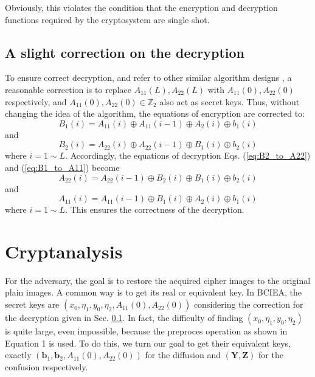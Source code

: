 \documentclass[final,3p,times,twocolumn]{elsarticle}
\begin{document}
Obviously, this violates the condition that the encryption and decryption functions required by the cryptosystem are single shot.

\subsection{A slight correction on the decryption}
\label{ssec:correction}

To ensure correct decryption, and refer to other similar algorithm designs \cite{ozkaynak:review:ND18}, a reasonable correction is to replace $A_{11}(L),A_{22}(L)$ with $A_{11}(0),A_{22}(0)$ respectively, and $A_{11}(0),A_{22}(0) \in \mathbb{Z}_{2}$ also act as secret keys.
Thus, without changing the idea of the algorithm, the equations of encryption are corrected to:
\begin{equation}
B_1(i) = A_{11}(i) \oplus A_{11}(i-1) \oplus A_{2}(i) \oplus b_{1}(i)
\label{eq:corr_B1_diffusion}
\end{equation}
and 
\begin{equation}
B_2(i) = A_{22}(i) \oplus A_{22}(i-1) \oplus B_{1}(i) \oplus b_{2}(i)
\label{eq:corr_B2_diffusion}
\end{equation}
where $i=1 \sim L$. Accordingly, the equations of decryption Eqs. (\ref{eq:B2_to_A22}) and (\ref{eq:B1_to_A11}) become
\begin{equation}
A_{22}(i) = A_{22}(i-1) \oplus B_2(i) \oplus B_{1}(i) \oplus b_{2}(i)
\label{eq:corr_B2_to_A22}
\end{equation}
and
\begin{equation}
A_{11}(i) = A_{11}(i-1)\oplus B_1(i) \oplus A_{2}(i) \oplus b_{1}(i)
\label{eq:corr_B1_to_A11}
\end{equation}
where $i=1 \sim L$. 
This ensures the correctness of the decryption.

\section{Cryptanalysis}
\label{sec3:Cryptanalysis}

For the adversary, the goal is to restore the acquired cipher images to the original plain images. A common way is to get its real or equivalent key. In BCIEA, the secret keys are $(x_0,\eta_1,y_0,\eta_2,A_{11}(0),A_{22}(0))$ considering the correction for the decryption given in Sec. \ref{ssec:correction}. 
In fact, the difficulty of finding $(x_0,\eta_1,y_0,\eta_2)$ is quite large, even impossible, because the preproces operation as shown in Equation 1 is used. To do this, we turn our goal to get their equivalent keys, exactly $(\bm{b}_1,\bm{b}_2,A_{11}(0),A_{22}(0))$ for the diffusion and $(\bm{Y},\bm{Z})$ for the confusion respectively.
\end{document}
